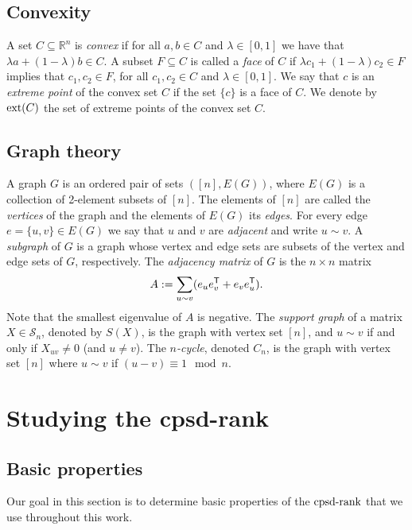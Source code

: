 \documentclass{siamart}
\begin{document}
{{{{\subsection*{Convexity}

A set $C \subseteq {\mathbb{R}}^{n}$ is {\em convex} if for all $a, b \in C$  and $\lambda \in [0,1]$ we have that  $\lambda a + (1-\lambda) b \in C$. A subset $F\subseteq C $ is called a {\em face} of $C$ if $\lambda c_1+(1-\lambda)c_2\in F$ implies that $c_1,c_2\in F$, for all $c_1,c_2\in C$ and $\lambda\in [0,1]$. We say that $c$ is an {\em extreme point} of the convex set $C$ if the set  $\{c\}$ is a face of $C$. We denote by ${\rm ext} (C)$ the set of extreme points of the convex set $C$.

\subsection*{Graph theory}

A graph $G$ is an ordered pair of sets $([n],E(G))$, where $E(G)$ is a collection of 2-element subsets of $[n]$. The elements of $[n]$ are called the {\em vertices} of the graph and the elements of $E(G)$  its {\em edges}. For every edge  $e=\{u,v\} \in E(G)$ we say that $u$ and $v$ are  {\em adjacent} and write $u\sim v$. A {\em subgraph} of $G$ is a graph whose vertex and edge sets are subsets of the vertex and {edge} sets of $G$, respectively. The {\em adjacency matrix} of $G$ is the $n\times n$  matrix
\[ {A:=\sum_{u\sim v}(e_ue_v^{{\sf T}}+e_ve_u^{{\sf T}})}. \]
Note that the smallest eigenvalue of $A$ is negative.
The {\em support graph} of a  matrix $X\in{\mathcal{S}}_n$, denoted by $S(X)$, is the  graph with vertex set $[n]$, {and} $u\sim v$ if and only if $X_{uv}\ne 0$ (and  $u \neq v$).  The {\em $n$-cycle}, denoted $C_n$,  is the graph with vertex set $[n]$ where $u\sim v$ if $(u-v)\equiv 1\mod n$.

\section{Studying the cpsd-rank}\label{sec:properties}

\subsection{Basic properties}\label{sec:basic}

{Our goal in this  section is to  determine basic    properties of the ${\mathrm{cpsd}\textnormal{-rank}}$ that we use throughout this work.}

}}}}
\end{document}
